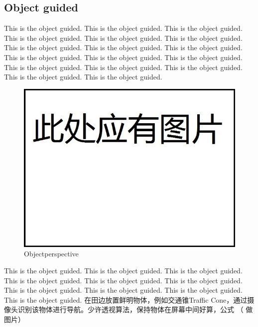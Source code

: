 \documentclass[12pt]{article}
\begin{document}
\begin{flushleft}
\subsection{Object guided}
This is the object guided. This is the object guided. This is the object guided. This is the object guided. This is the object guided. This is the object guided. This is the object guided. This is the object guided. This is the object guided. This is the object guided. This is the object guided. This is the object guided. This is the object guided. This is the object guided. This is the object guided. This is the object guided. This is the object guided. 
\begin{figure}[ht!]
	\begin{center}
		\includegraphics[scale = 0.6]{objectperspective.jpg}
		\caption{Objectperspective}
	\end{center}
\end{figure}
This is the object guided. This is the object guided. This is the object guided. This is the object guided. This is the object guided. This is the object guided. This is the object guided. This is the object guided. This is the object guided. This is the object guided. 
在田边放置鲜明物体，例如交通锥Traffic Cone，通过摄像头识别该物体进行导航。少许透视算法，保持物体在屏幕中间好算，公式 （ 做图片）


\end{flushleft}
\end{document}

